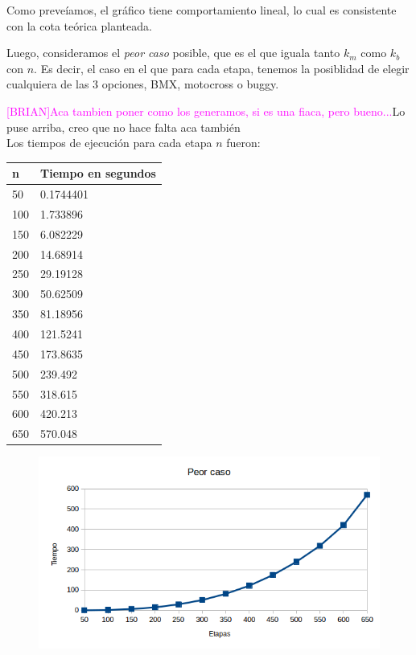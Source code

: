   Como preve\'iamos, el gr\'afico tiene comportamiento lineal, lo cual es consistente con la cota te\'orica planteada.
  
  \newpage
   
  Luego, consideramos el \emph{peor caso} posible, que es el que iguala tanto $k_m$ como $k_b$ con $n$.
  Es decir, el caso en el que para cada etapa, tenemos la posiblidad de elegir cualquiera de las 3 opciones, BMX, motocross o buggy.
  
  \textcolor{magenta}{[BRIAN]Aca tambien poner como los generamos, si es una fiaca, pero bueno...}\textcolor{azul}{Lo puse arriba, creo que no hace falta aca también}\\
  
  Los tiempos de ejecuci\'on para cada etapa $n$ fueron:
  
  \begin{table}[htb]
  \centering
  \begin{tabular}[c]{|l|l|}

		\hline
n & Tiempo en segundos\\
		\hline
50	&	0.1744401\\
		\hline
100	&	1.733896\\
		\hline
150	&	6.082229\\
		\hline
200	&	14.68914\\
		\hline
250	&	29.19128\\
		\hline
300	&	50.62509\\
		\hline
350	&	81.18956\\
		\hline
400	&	121.5241\\
		\hline
450	&	173.8635\\
		\hline
500	&	239.492\\
		\hline
550	&	318.615\\
		\hline
600	&	420.213\\
		\hline
650	&	570.048\\
		\hline

	\end{tabular}
	\end{table}
	
  \begin{figure}[h!]
   \begin{center}
	\includegraphics[scale=0.8]{imagenes/ej1/peorCaso1.png}
   \end{center}
  \end{figure}
  
